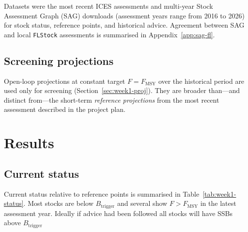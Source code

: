 \documentclass[11pt,a4paper]{extarticle}
\begin{document}
{\footnotesize
	\begin{table}[H]
		\centering
		\caption{SAG assessment-year coverage for candidate stocks.}
		\label{tab:week1-sagcov}
		
	\end{table}}

Datasets were the most recent ICES assessments and multi-year Stock
Assessment Graph (SAG) downloads (assessment years range from 2016 to 2026)
for stock status, reference points, and historical advice. Agreement between
SAG and local \texttt{FLStock} assessments is summarised in
Appendix~\ref{app:sag-fl}.

\subsection{Screening projections}

Open-loop projections at constant target \(F = F_{\mathrm{MSY}}\) over the
historical period are used only for screening
(Section~\ref{sec:week1-proj}). They are broader than---and distinct from---the
short-term \emph{reference projections} from the most recent assessment
described in the project plan.

\section{Results}
\label{sec:week1-results}

\subsection{Current status}

Current status relative to reference points is summarised in Table~\ref{tab:week1-status}. Most stocks are below \(B_{\mathrm{trigger}}\) and several show \(F > F_{\mathrm{MSY}}\) in the latest assessment year. Ideally if advice had been followed all stocks will have SSBs above \(B_{\mathrm{trigger}}\)


{\footnotesize
	\begin{table}[H]
		\centering
		\caption{Latest SAG terminal year with relative and absolute status.
			SSB ratios and absolute SSB: green above \(B_{\mathrm{trigger}}\),
			amber between \(B_{\lim}\) and \(B_{\mathrm{trigger}}\),
			red below \(B_{\lim}\).
			\(F\) and \(F/F_{\mathrm{MSY}}\): green at or below \(F_{\mathrm{MSY}}\),
			red above.}
		\label{tab:week1-status}
		\resizebox{\textwidth}{!}{}
	\end{table}
}
\end{document}
